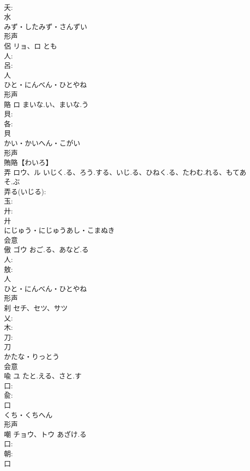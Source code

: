 \documentclass[8pt]{extreport}
\begin{document}
\begin{CJK}{UTF8}{min}
\\	夭: 
\\	水	
\\	みず・したみず・さんずい	
\\	形声 
\\	侶	リョ、ロ	とも		
\\	人: 
\\	呂: 
\\	人	
\\	ひと・にんべん・ひとやね	
\\	形声 
\\	賂	ロ	まいな.い、まいな.う		
\\	貝: 
\\	各: 
\\	貝	
\\	かい・かいへん・こがい	
\\	形声 
\\	賄賂【わいろ】 
\\	弄	ロウ、ル	いじく.る、ろう.する、いじ.る、ひねく.る、たわむ.れる、もてあそ.ぶ		
\\	弄る(いじる): 
\\	玉: 
\\	廾: 
\\	廾	
\\	にじゅう・にじゅうあし・こまぬき	
\\	会意 
\\	傲	ゴウ	おご.る、あなど.る		
\\	人: 
\\	敖: 
\\	人	
\\	ひと・にんべん・ひとやね	
\\	形声 
\\	刹	セチ、セツ、サツ			
\\	乂: 
\\	木: 
\\	刀: 
\\	刀	
\\	かたな・りっとう	
\\	会意 
\\	喩	ユ	たと.える、さと.す		
\\	口: 
\\	兪: 
\\	口	
\\	くち・くちへん	
\\	形声 
\\	嘲	チョウ、トウ	あざけ.る		
\\	口: 
\\	朝: 
\\	口	

\end{CJK}
\end{document}

